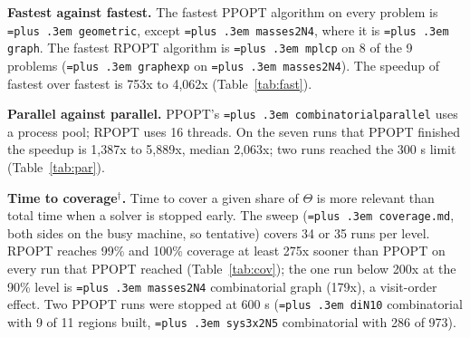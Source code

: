 \documentclass[10pt,a4paper]{article}
\newcommand{\busy}{$^\dagger$}
\newcommand{\sizenote}{Size is $n_\theta/n_x/m$: parameters, variables, constraints (Table~\ref{tab:sizes}).}
\newcommand{\rpopt}{RPOPT}
\newcommand{\ppopt}{PPOPT}
\newcommand{\code}[1]{{\let\_\bu\texttt{\spaceskip=\fontdimen2\font plus .3em #1}}}
\newcommand{\bu}{\textunderscore\hspace{0pt}}
\begin{document}
\begin{table}[!htbp]
\centering\small\setlength{\tabcolsep}{4pt}
\caption{mpQP, same algorithm, single thread (\code{bench/results/speedup.md}). \ppopt{} time limit 300 s, except two 4 h runs (\code{di\_N10}, \code{sys3x2\_N5} combinatorial). The last column is the region count: equal for \ppopt{} and \rpopt{} on every finished run, and \rpopt{}'s count where \ppopt{} did not finish (marked $>$). \sizenote}
\label{tab:same}

\end{table}

\textbf{Fastest against fastest.} The fastest \ppopt{} algorithm on every problem is \code{geometric}, except \code{masses2\_N4}, where it is \code{graph}. The
fastest \rpopt{} algorithm is \code{mplcp} on 8 of the 9 problems (\code{graph\_exp} on \code{masses2\_N4}). The speedup of fastest over fastest is
753x to 4,062x (Table~\ref{tab:fast}).

\begin{table}[!htbp]
\centering\small
\caption{Fastest serial algorithm per problem, one thread (\code{speedup.md}). \sizenote}
\label{tab:fast}

\end{table}

\textbf{Parallel against parallel.} \ppopt{}'s \code{combinatorial\_parallel} uses a process pool; \rpopt{} uses 16 threads. On the seven runs that \ppopt{} finished the speedup is 1,387x to
5,889x, median 2,063x; two runs reached the 300 s limit (Table~\ref{tab:par}).

\begin{table}[!htbp]
\centering\small
\caption{Parallel against parallel (\code{speedup.md}). Regions: equal for \ppopt{} and \rpopt{} on every finished run, \rpopt{}'s count where \ppopt{} did not finish (marked $>$). \sizenote}
\label{tab:par}

\end{table}

\textbf{Time to coverage\busy{}.} Time to cover a given share of $\Theta$ is more relevant than total time when a solver is stopped early. The sweep
(\code{coverage.md}, both sides on the busy machine, so tentative) covers 34 or 35 runs per level. \rpopt{} reaches 99\% and 100\% coverage at least 275x
sooner than \ppopt{} on every run that \ppopt{} reached (Table~\ref{tab:cov}); the one run below 200x at the 90\% level is \code{masses2\_N4}
combinatorial graph (179x), a visit-order effect. Two \ppopt{} runs were stopped at 600 s (\code{di\_N10} combinatorial with 9 of 11 regions built, \code{sys3x2\_N5}
combinatorial with 286 of 973).
\end{document}
